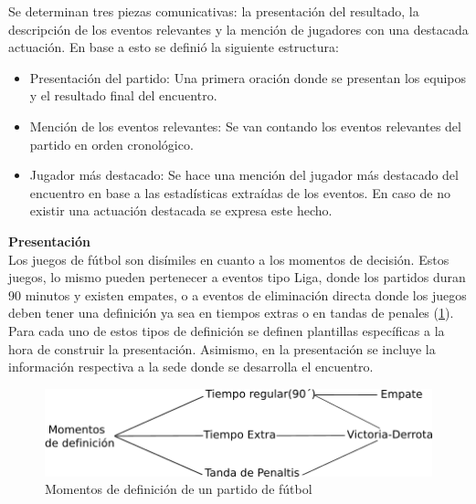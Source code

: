 
    Se determinan tres piezas comunicativas: la presentación del resultado, la descripción de los eventos relevantes y 
la mención de jugadores con una destacada actuación. En base a esto se definió la siguiente estructura:

\begin{itemize}
    \item Presentación del partido: Una primera oración donde se presentan los equipos y el resultado final del encuentro.
    \item Mención de los eventos relevantes: Se van contando los eventos relevantes del partido en orden cronol\'ogico.
    \item Jugador más destacado: Se hace una mención del jugador más destacado del encuentro en base a las estadísticas extraídas de los 
    eventos. En caso de no existir una actuación destacada se expresa este hecho.
\end{itemize}


    \textbf{Presentación}\\

   Los juegos de fútbol son disímiles en cuanto a los momentos de decisión. Estos juegos, lo mismo pueden pertenecer a eventos tipo Liga, donde los partidos 
duran 90 minutos y existen empates, o a eventos de eliminación directa donde los juegos deben tener una definición ya sea en tiempos extras 
o en tandas de penales (\ref{fig_momentos_definicion}). Para cada uno de estos tipos de definición se definen plantillas específicas a la hora de construir la presentación. Asimismo, en la presentación se incluye la información 
respectiva a la sede donde se desarrolla el encuentro.\\

    \begin{figure}[!]
        \begin{center}
            \includegraphics[scale=1]{Graphics/momentodef.png}
        \end{center}
        \caption{Momentos de definición de un partido de fútbol}
        \label{fig_momentos_definicion}
    \end{figure}

